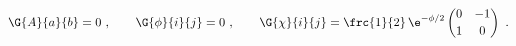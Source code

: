 \begin{equation}
  \G{A}{a}{b} = 0\ ,\qquad \G{\phi}{i}{j} = 0\ ,\qquad \G{\chi}{i}{j}
  = \frc{1}{2}\, \e^{-\phi/2} \begin{pmatrix} 0 & -1 \\[2pt] 1 & 0
  \end{pmatrix}\ .
 \end{equation}

